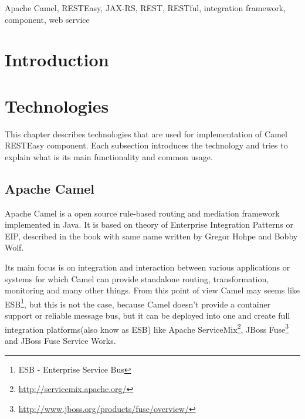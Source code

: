 \documentclass[12pt,final,oneside]{fithesis2}
\begin{document}
\FrontMatter
\ThesisTitlePage

\begin{ThesisDeclaration}
  \DeclarationText
  \AdvisorName
\end{ThesisDeclaration}

\begin{ThesisThanks}
 
\end{ThesisThanks}

\begin{ThesisAbstract}

\end{ThesisAbstract}

\begin{ThesisKeyWords}
Apache Camel, RESTEasy, JAX-RS, REST, RESTful, integration framework, component, web service

\end{ThesisKeyWords}

\MainMatter

\tableofcontents

\chapter{Introduction}


\chapter{Technologies}
This chapter describes technologies that are used for implementation of Camel RESTEasy  component. Each subsection introduces the technology and tries to explain what is its main functionality and common usage.

\section{Apache Camel}
Apache Camel is a open source rule-based routing and mediation framework implemented in Java. It is based on theory of Enterprise Integration Patterns or EIP, described in the book with same name written by Gregor Hohpe and Bobby Wolf\cite{eip}.

Its main focus is on integration and interaction between various applications or systems for which Camel can provide standalone routing, transformation, monitoring and many other things. From this point of view Camel may seems like ESB\footnote{ESB - Enterprise Service Bus}, but this is not the case, because Camel doesn't provide a container support or reliable message bus, but it can be deployed into one and create full integration platforms(also know as ESB) like Apache ServiceMix\footnote{\url{http://servicemix.apache.org/}}, JBoss Fuse\footnote{\url{http://www.jboss.org/products/fuse/overview/}} and JBoss Fuse Service Works. 
\end{document}

